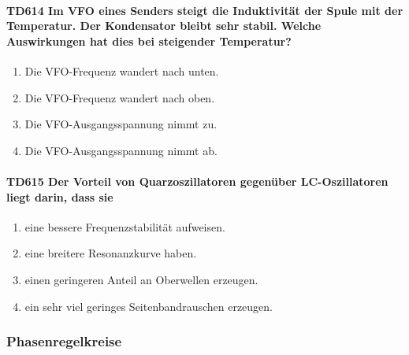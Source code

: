 \documentclass[8pt]{article}
\begin{document}
\begin{enumerate}
\begin{enumerate}[nolistsep,label=\Alph*]
\paragraph*{TD614 Im VFO eines Senders steigt die Induktivität der Spule mit der Temperatur. Der Kondensator bleibt sehr stabil. Welche Auswirkungen hat dies bei steigender Temperatur?}
\begin{enumerate}[nolistsep,label=\Alph*]
\item Die VFO-Frequenz wandert nach unten.
\item Die VFO-Frequenz wandert nach oben.
\item Die VFO-Ausgangsspannung nimmt zu.
\item Die VFO-Ausgangsspannung nimmt ab.
\end{enumerate}

\paragraph*{TD615 Der Vorteil von Quarzoszillatoren gegenüber LC-Oszillatoren liegt darin, dass sie} 
\begin{enumerate}[nolistsep,label=\Alph*]
\item eine bessere Frequenzstabilität aufweisen.
\item eine breitere Resonanzkurve haben.
\item einen geringeren Anteil an Oberwellen erzeugen.
\item ein sehr viel geringes Seitenbandrauschen erzeugen.
\end{enumerate}

\pagebreak
\subsubsection{Phasenregelkreise}

\end{enumerate}
\end{enumerate}
\end{document}
